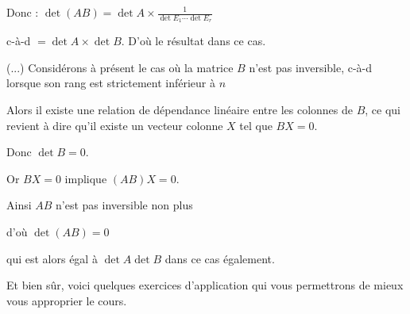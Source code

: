 \change
Donc :
$\det(AB) = \det A \times \frac1{\det E_1 \cdots \det E_r} $

\change
c-à-d $= \det A \times \det B.$
D'où le résultat dans ce cas.

\change
(...)
\newpage
Considérons à présent le cas où la matrice $B$ n'est pas inver\-sible, c-à-d lorsque son rang est strictement inférieur à $n$

\change
Alors il existe une relation de dépendance linéaire entre les colonnes de $B$, 
ce qui revient à dire qu'il existe un vecteur colonne $X$ tel que $BX=0$.

\change
 Donc  $\det B=0$.
 
\change
Or $BX=0$ implique $(AB)X=0$. 

\change
Ainsi $AB$ n'est pas inversible non plus

\change
d'où 
$\det (AB)=0$

\change
qui est alors égal à $\det A\det B$ dans ce cas également.


\diapo
Et bien sûr, voici quelques exercices d'application qui vous permettrons de mieux vous approprier le cours.


